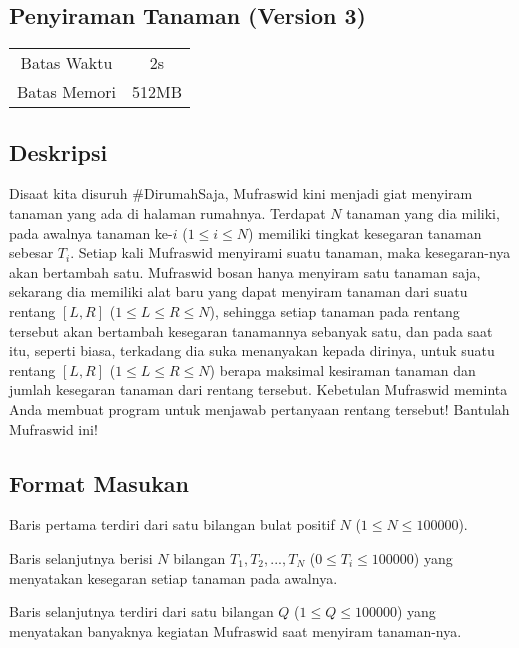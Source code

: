 \documentclass{article}
\begin{document}
\begin{center}
    \section*{Penyiraman Tanaman (Version 3)} %

    \begin{tabular}{ | c c | }
        \hline
        Batas Waktu  & 2s \\    %
        Batas Memori & 512MB \\  %
        \hline
    \end{tabular}
\end{center}

\subsection*{Deskripsi}
Disaat kita disuruh \#DirumahSaja, Mufraswid kini menjadi giat menyiram tanaman yang ada di halaman rumahnya. Terdapat $N$ tanaman yang dia miliki, pada awalnya tanaman ke-$i$ ($1 \leq i \leq N$) memiliki tingkat kesegaran tanaman sebesar $T_i$. Setiap kali Mufraswid menyirami suatu tanaman, maka kesegaran-nya akan bertambah satu. Mufraswid bosan hanya menyiram satu tanaman saja, sekarang dia memiliki alat baru yang dapat menyiram tanaman dari suatu rentang $\left[L, R \right]$ ($1 \leq L \leq R \leq N$), sehingga setiap tanaman pada rentang tersebut akan bertambah kesegaran tanamannya sebanyak satu, dan pada saat itu, seperti biasa, terkadang dia suka menanyakan kepada dirinya, untuk suatu rentang $\left[L, R \right]$ ($1 \leq L \leq R \leq N$) berapa maksimal kesiraman tanaman dan jumlah kesegaran tanaman dari rentang tersebut. Kebetulan Mufraswid meminta Anda membuat program untuk menjawab pertanyaan rentang tersebut! Bantulah Mufraswid ini!


\subsection*{Format Masukan}

Baris pertama terdiri dari satu bilangan bulat positif $N$ ($1 \leq N \leq 100000$).

Baris selanjutnya berisi $N$ bilangan $T_1, T_2, ..., T_N$ ($0 \leq T_i \leq 100000$) yang menyatakan kesegaran setiap tanaman pada awalnya.

Baris selanjutnya terdiri dari satu bilangan $Q$ ($1\leq Q\leq 100000$) yang menyatakan banyaknya kegiatan Mufraswid saat menyiram tanaman-nya.
\end{document}
